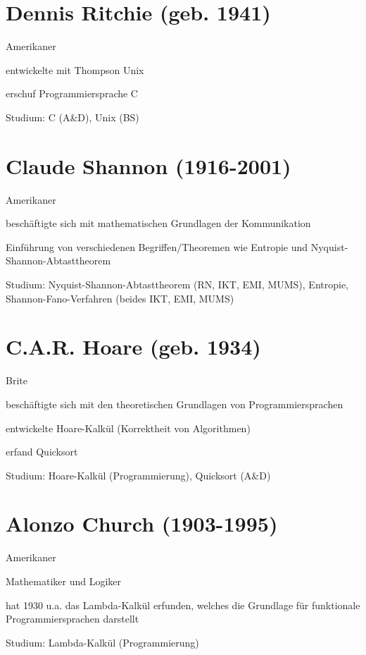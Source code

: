 \documentclass[a4paper,12pt]{report}
\begin{document}
\section{Dennis Ritchie (geb. 1941)}
\begin{itemize*}
\item Amerikaner
\item entwickelte mit Thompson Unix
\item erschuf Programmiersprache C
\item Studium: C (A\&D), Unix (BS)
\end{itemize*}

\section{Claude Shannon (1916-2001)}
\begin{itemize*}
\item Amerikaner
\item beschäftigte sich mit mathematischen Grundlagen der Kommunikation
\item Einführung von verschiedenen Begriffen/Theoremen wie Entropie und Nyquist-Shannon-Abtasttheorem
\item Studium: Nyquist-Shannon-Abtasttheorem (RN, IKT, EMI, MUMS), Entropie, Shannon-Fano-Verfahren (beides IKT, EMI, MUMS)
\end{itemize*}
                                                                         
\section{C.A.R. Hoare (geb. 1934)}
\begin{itemize*}
\item Brite
\item beschäftigte sich mit den theoretischen Grundlagen von Programmiersprachen
\item entwickelte Hoare-Kalkül (Korrektheit von Algorithmen)
\item erfand Quicksort
\item Studium: Hoare-Kalkül (Programmierung), Quicksort (A\&D)
\end{itemize*}

\section{Alonzo Church (1903-1995)}
\begin{itemize*}
\item Amerikaner 
\item Mathematiker und Logiker
\item hat 1930 u.a. das Lambda-Kalkül erfunden, welches die Grundlage für funktionale Programmiersprachen darstellt
\item Studium: Lambda-Kalkül (Programmierung)
\end{itemize*}
\end{document}
